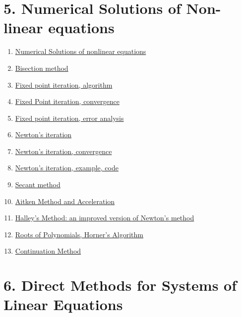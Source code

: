 \documentclass[11pt]{article}
\begin{document}
\section*{5. Numerical Solutions of Non-linear equations}

\vspace{-0.5cm}

\begin{multicols}{2}
	\begin{enumerate}
		\item \href{https://mp.weixin.qq.com/s/yr5EHHwZVtPGon3EdBoDzA}{Numerical Solutions of nonlinear equations}	%
		\item \href{https://mp.weixin.qq.com/s/Ph10nb81tuMZ47YzqciLVA}{Bisection method}	%
		\item \href{https://mp.weixin.qq.com/s/11ak7oZXlkzshrAGEEN2KA}{Fixed point iteration, algorithm}	%
		\item \href{https://mp.weixin.qq.com/s/QrKBuI9ZjwAFwDfW-_Nbbw}{Fixed Point iteration, convergence}	%
		\item \href{https://mp.weixin.qq.com/s/s4O2FA2BVJkFaT8_JxMeTA}{Fixed point iteration, error analysis}	%
		\item \href{https://mp.weixin.qq.com/s/cTfmwA3OUkn4altTOktS4Q}{Newton's iteration}	%
		\item \href{https://mp.weixin.qq.com/s/sdMxmu7SPBb_pO6pfLH4Jw}{Newton's iteration, convergence}	%
		\item \href{https://mp.weixin.qq.com/s/0uuR1jTBduU4bDrUjUFcvA}{Newton's iteration, example, code}	%
		\item \href{https://mp.weixin.qq.com/s/vdyiZ3I6bRUOoDIiOQJO1w}{Secant method}	%
		\item \href{https://mp.weixin.qq.com/s/KXqvDSYHKoAjBZpUB_IjKA}{Aitken Method and Acceleration}	%
		\item \href{https://mp.weixin.qq.com/s/jrY_M_J5DfQAyZxXCf1Q8A}{Halley's Method: an improved version of Newton's method}	%
		\item \href{https://mp.weixin.qq.com/s/lBUY6TME_k3m3MCwKZuflQ}{Roots of Polynomials,  Horner's Algorithm}	%
		\item \href{https://mp.weixin.qq.com/s/Z5gQYKfK1C8mfl8LysA6Dg}{Continuation Method}	%
	\end{enumerate}
\end{multicols}

\vspace{-1cm}

\section*{6. Direct Methods for Systems of Linear Equations}
\end{document}
